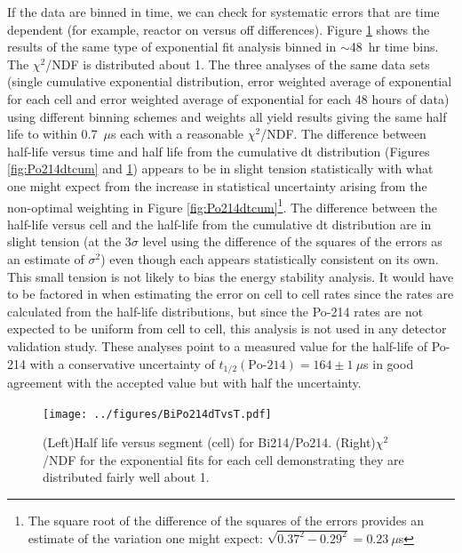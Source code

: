 If the data are binned in time, we can check for systematic errors that are time dependent (for example, reactor on versus off differences). Figure \ref{fig:Po214thalfvstime} shows the results of the same type of exponential fit analysis binned in $\sim$48~hr time bins. The $\chi^2$/NDF is distributed about 1. The three analyses of the same data sets (single cumulative exponential distribution, error weighted average of exponential for each cell and error weighted average of exponential for each 48 hours of data) using different binning schemes and weights all yield results giving the same half life to within 0.7~$\mu$s each with a reasonable $\chi^2$/NDF. The difference between half-life versus time and half life from the cumulative dt distribution (Figures \ref{fig:Po214dtcum} and \ref{fig:Po214thalfvstime}) appears to be in slight tension statistically with what one might expect from the increase in statistical uncertainty arising from the non-optimal weighting in Figure \ref{fig:Po214dtcum}\footnote{The square root of the difference of the squares of the errors provides an estimate of the variation one might expect: $\sqrt{0.37^2-0.29^2}=0.23~\mu$s}. The difference between the half-life versus cell and the half-life from the cumulative dt distribution are in slight tension (at the 3$\sigma$ level using the difference of the squares of the errors as an estimate of $\sigma^2$) even though each appears statistically consistent on its own. This small tension is not likely to bias the energy stability analysis. It would have to be factored in when estimating the error on cell to cell rates since the rates are calculated from the half-life distributions, but since the Po-214 rates are not expected to be uniform from cell to cell, this analysis is not used in any detector validation study. These analyses point to a measured value for the half-life of Po-214 with a conservative uncertainty of $t_{1/2}(\textrm{Po-214})=164\pm1~\mu$s in good agreement with the accepted value but with half the uncertainty.  
\begin{figure}[!h]
	\centering
	\texttt{[image: ../figures/BiPo214dTvsT.pdf]}
	\caption{\label{fig:Po214thalfvstime}(Left)Half life versus segment (cell) for Bi214/Po214. (Right)$\chi^2$/NDF for the exponential fits for each cell demonstrating they are distributed fairly well about 1.}
\end{figure}

